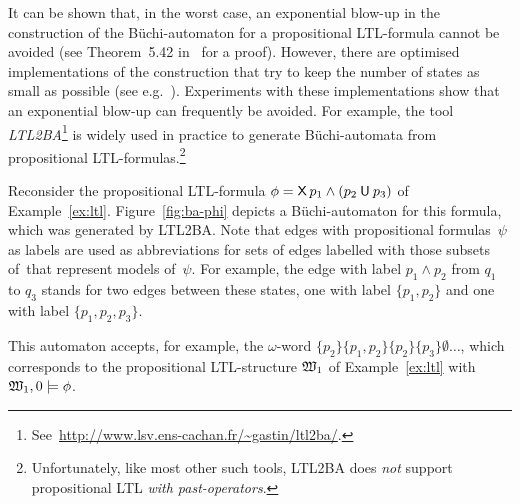 It can be shown that, in the worst case, an exponential blow-up in the
construction of the Büchi-automaton for a propositional LTL-formula cannot be
avoided (see Theorem~5.42 in~\cite{BaKa-08} for a proof).  However, there are
optimised implementations of the construction that try to keep the number of
states as small as possible (see
e.g.~\cite{GaOd-CAV01,GaOd-MFCS03,GPV+-PSTV96}).  Experiments with these
implementations show that an exponential blow-up can frequently be avoided.  For
example, the tool \emph{LTL2BA}\footnote{%
    See~\url{http://www.lsv.ens-cachan.fr/~gastin/ltl2ba/}.}
is widely used in practice to generate Büchi-automata from propositional
LTL-formulas.\footnote{%
    Unfortunately, like most other such tools, LTL2BA does \emph{not} support
    propositional LTL \emph{with past-operators}.}

\begin{example}
    Reconsider the propositional LTL-formula
    $\phi=\operatorname{\mathsf{X}} p_1\land(p_2\mathbin{\mathsf{U}} p_3)$ of Example~\ref{ex:ltl}.
    Figure~\ref{fig:ba-phi} depicts a Büchi-automaton for this formula, which
    was generated by LTL2BA\@.  Note that edges with propositional
    formulas~$\psi$ as labels are used as abbreviations for sets of edges
    labelled with those subsets of~\Pmc that represent models of~$\psi$.  For
    example, the edge with label $p_1\land p_2$ from $q_1$ to $q_3$ stands for
    two edges between these states, one with label $\{p_1,p_2\}$ and one with
    label $\{p_1,p_2,p_3\}$.

    This automaton accepts, for example, the $\omega$-word
    $\{p_2\}\{p_1,p_2\}\{p_2\}\{p_3\}\emptyset\dots$,
    which corresponds to the propositional LTL-structure $\mathfrak{W}_1$ of
    Example~\ref{ex:ltl} with $\mathfrak{W}_1,0\models\phi$.
\end{example}

